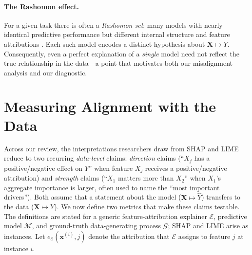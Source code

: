 \documentclass[12pt,letterpaper]{article}
\newcommand{\bx}{\mathbf{x}}
\newcommand{\mG}{\mathcal{G}}
\newcommand{\mM}{\mathcal{M}}
\newcommand{\mE}{\mathcal{E}}
\newcommand{\Xto}{\mathbf{X}\mapsto Y}
\newcommand{\Xtohat}{\mathbf{X}\mapsto \hat{Y}}
\begin{document}
\vspace{-3mm}
\paragraph{The Rashomon effect.}
For a given task there is often a \emph{Rashomon set}: many models with nearly
identical predictive performance but different internal structure and feature
attributions \citep{semenova22rashomon,paes23inevitable,rudin2024amazingthingscomehaving}.
Each such model encodes a distinct hypothesis about $\Xto$. Consequently, even a
perfect explanation of a \emph{single} model need not reflect the true relationship
in the data---a point that motivates both our misalignment analysis and our
diagnostic.

\section{Measuring Alignment with the Data}
\label{sec:metrics}

Across our review, the interpretations researchers draw from SHAP and LIME reduce to
two recurring \emph{data-level} claims: \emph{direction} claims (``$X_j$ has a
positive/negative effect on $Y$'' when feature $X_j$ receives a positive/negative
attribution) and \emph{strength} claims (``$X_1$ matters more than $X_2$'' when
$X_1$'s aggregate importance is larger, often used to name the ``most important
drivers''). Both assume that a statement about the model ($\Xtohat$) transfers to
the data ($\Xto$). We now define two metrics that make these claims testable. The
definitions are stated for a generic feature-attribution explainer $\mE$, predictive model
$\mM$, and ground-truth data-generating process $\mG$; SHAP and LIME arise as
instances. Let $e_{\mE}(\bx^{(i)},j)$ denote the attribution that $\mE$ assigns to
feature $j$ at instance $i$.
\end{document}
